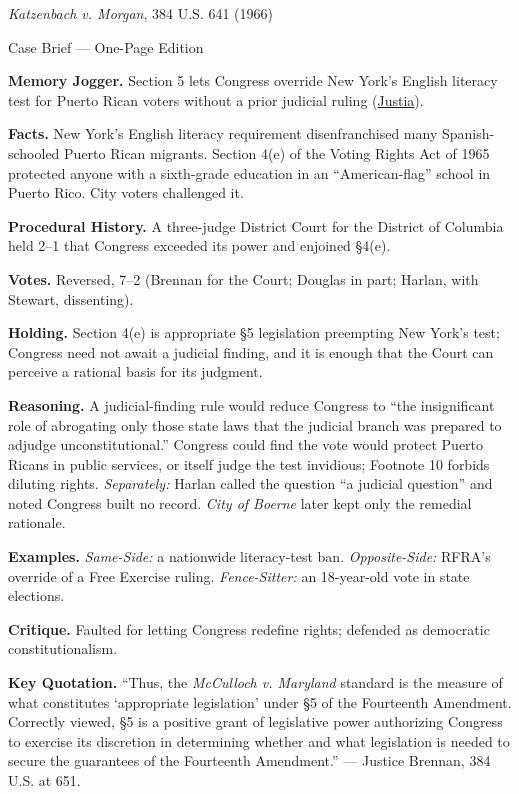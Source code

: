 \documentclass[12pt]{article}
\begin{document}
\begin{center}
{\Large \textit{Katzenbach v. Morgan}, 384 U.S. 641 (1966)\par}
\vspace{0.3em}
{\normalsize Case Brief --- One-Page Edition\par}
\end{center}

\textbf{Memory Jogger.} Section 5 lets Congress override New York's English literacy test for Puerto Rican voters without a prior judicial ruling (\href{https://supreme.justia.com/cases/federal/us/384/641/}{Justia}).

\textbf{Facts.} New York's English literacy requirement disenfranchised many Spanish-schooled Puerto Rican migrants. Section 4(e) of the Voting Rights Act of 1965 protected anyone with a sixth-grade education in an ``American-flag'' school in Puerto Rico. City voters challenged it.

\textbf{Procedural History.} A three-judge District Court for the District of Columbia held 2--1 that Congress exceeded its power and enjoined \S 4(e).

\textbf{Votes.} Reversed, 7--2 (Brennan for the Court; Douglas in part; Harlan, with Stewart, dissenting).

\textbf{Holding.} Section 4(e) is appropriate \S 5 legislation preempting New York's test; Congress need not await a judicial finding, and it is enough that the Court can perceive a rational basis for its judgment.

\textbf{Reasoning.} A judicial-finding rule would reduce Congress to ``the insignificant role of abrogating only those state laws that the judicial branch was prepared to adjudge unconstitutional.'' Congress could find the vote would protect Puerto Ricans in public services, or itself judge the test invidious; Footnote 10 forbids diluting rights. \emph{Separately:} Harlan called the question ``a judicial question'' and noted Congress built no record. \textit{City of Boerne} later kept only the remedial rationale.

\textbf{Examples.} \emph{Same-Side:} a nationwide literacy-test ban. \emph{Opposite-Side:} RFRA's override of a Free Exercise ruling. \emph{Fence-Sitter:} an 18-year-old vote in state elections.

\textbf{Critique.} Faulted for letting Congress redefine rights; defended as democratic constitutionalism.

\textbf{Key Quotation.} ``Thus, the \textit{McCulloch v. Maryland} standard is the measure of what constitutes `appropriate legislation' under \S 5 of the Fourteenth Amendment. Correctly viewed, \S 5 is a positive grant of legislative power authorizing Congress to exercise its discretion in determining whether and what legislation is needed to secure the guarantees of the Fourteenth Amendment.'' --- Justice Brennan, 384 U.S. at 651.
\end{document}
